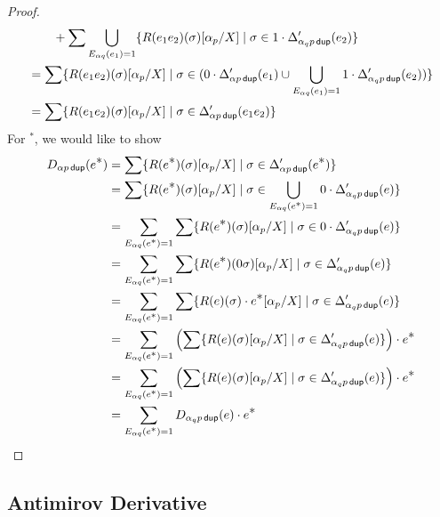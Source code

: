 \documentclass{article}
\newcommand\pdup{\mathop{\mathsf{dup}}}
\renewcommand\star{^{\textstyle *}}
\begin{document}
\begin{proof}
\begin{align*}
& \qquad + \sum\bigcup_{E_{\alpha q}(e_1)=1}\set{\rep{\sigma}{e_1e_2}\subst{\alpha_p}X}{\sigma\in 1\cdot\Delta'_{\alpha_qp\pdup}(e_2)}\\
&= \sum\set{\rep{\sigma}{e_1e_2}\subst{\alpha_p}X}{\sigma\in (0\cdot\Delta'_{\alpha p\pdup}(e_1) \cup \bigcup_{E_{\alpha q}(e_1)=1} 1\cdot\Delta'_{\alpha_qp\pdup}(e_2))}\\
&= \sum\set{\rep{\sigma}{e_1e_2}\subst{\alpha_p}X}{\sigma\in\Delta'_{\alpha p\pdup}(e_1e_2)}
\end{align*}
For $\star$, we would like to show
\begin{align*}
D_{\alpha p\pdup}(e\star) &= \sum\set{\rep\sigma{e\star}\subst{\alpha_p}X}{\sigma\in\Delta'_{\alpha p\pdup}(e\star)}\\
&= \sum\set{\rep\sigma{e\star}\subst{\alpha_p}X}{\sigma\in\bigcup_{E_{\alpha q}(e^{\scriptstyle *})=1} 0\cdot\Delta'_{\alpha_qp\pdup}(e)}\\
&= \sum_{E_{\alpha q}(e^{\scriptstyle *})=1}\sum\set{\rep\sigma{e\star}\subst{\alpha_p}X}{\sigma\in 0\cdot\Delta'_{\alpha_qp\pdup}(e)}\\
&= \sum_{E_{\alpha q}(e^{\scriptstyle *})=1}\sum\set{\rep{0\sigma}{e\star}\subst{\alpha_p}X}{\sigma\in\Delta'_{\alpha_qp\pdup}(e)}\\
&= \sum_{E_{\alpha q}(e^{\scriptstyle *})=1}\sum\set{\rep{\sigma}{e}\cdot e\star\subst{\alpha_p}X}{\sigma\in\Delta'_{\alpha_qp\pdup}(e)}\\
&= \sum_{E_{\alpha q}(e^{\scriptstyle *})=1}\left(\sum\set{\rep{\sigma}{e}\subst{\alpha_p}X}{\sigma\in\Delta'_{\alpha_qp\pdup}(e)}\right)\cdot e\star\\
&= \sum_{E_{\alpha q}(e^{\scriptstyle *})=1}\left(\sum\set{\rep{\sigma}{e}\subst{\alpha_p}X}{\sigma\in\Delta'_{\alpha_qp\pdup}(e)}\right)\cdot e\star\\
&= \sum_{E_{\alpha q}(e^{\scriptstyle *})=1}D_{\alpha_qp\pdup}(e)\cdot e\star\\
\end{align*}
\end{proof}

\subsection*{Antimirov Derivative}
\end{document}
